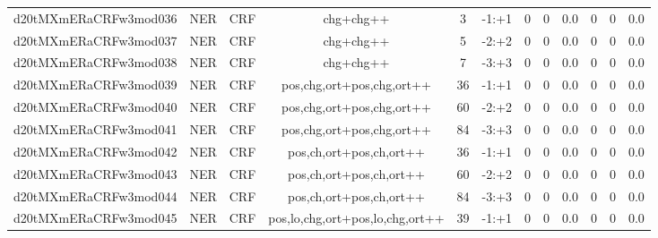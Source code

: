 \documentclass[a4paper]{article}
\begin{document}
\begin{landscape}
\begin{center}
\begin{tabular}{ |c|c|c|c|c|c|c|c|c|c|c|c|}
 
 	
 	\small{ d20tMXmERaCRFw3mod036 } & \small{ NER} & \small{  CRF }  & chg+chg++  &  3 &  \small{  -1:+1 }  &  0 & 0 & 0.0  &  0 & 0 & 0.0 \\
 	

 
 	
 	\small{ d20tMXmERaCRFw3mod037 } & \small{ NER} & \small{  CRF }  & chg+chg++  &  5 &  \small{  -2:+2 }  &  0 & 0 & 0.0  &  0 & 0 & 0.0 \\
 	

 
 	
 	\small{ d20tMXmERaCRFw3mod038 } & \small{ NER} & \small{  CRF }  & chg+chg++  &  7 &  \small{  -3:+3 }  &  0 & 0 & 0.0  &  0 & 0 & 0.0 \\
 	

 
 	
 	\small{ d20tMXmERaCRFw3mod039 } & \small{ NER} & \small{  CRF }  & pos,chg,ort+pos,chg,ort++  &  36 &  \small{  -1:+1 }  &  0 & 0 & 0.0  &  0 & 0 & 0.0 \\
 	

 
 	
 	\small{ d20tMXmERaCRFw3mod040 } & \small{ NER} & \small{  CRF }  & pos,chg,ort+pos,chg,ort++  &  60 &  \small{  -2:+2 }  &  0 & 0 & 0.0  &  0 & 0 & 0.0 \\
 	

 
 	
 	\small{ d20tMXmERaCRFw3mod041 } & \small{ NER} & \small{  CRF }  & pos,chg,ort+pos,chg,ort++  &  84 &  \small{  -3:+3 }  &  0 & 0 & 0.0  &  0 & 0 & 0.0 \\
 	

 
 	
 	\small{ d20tMXmERaCRFw3mod042 } & \small{ NER} & \small{  CRF }  & pos,ch,ort+pos,ch,ort++  &  36 &  \small{  -1:+1 }  &  0 & 0 & 0.0  &  0 & 0 & 0.0 \\
 	

 
 	
 	\small{ d20tMXmERaCRFw3mod043 } & \small{ NER} & \small{  CRF }  & pos,ch,ort+pos,ch,ort++  &  60 &  \small{  -2:+2 }  &  0 & 0 & 0.0  &  0 & 0 & 0.0 \\
 	

 
 	
 	\small{ d20tMXmERaCRFw3mod044 } & \small{ NER} & \small{  CRF }  & pos,ch,ort+pos,ch,ort++  &  84 &  \small{  -3:+3 }  &  0 & 0 & 0.0  &  0 & 0 & 0.0 \\
 	

 
 	
 	\small{ d20tMXmERaCRFw3mod045 } & \small{ NER} & \small{  CRF }  & pos,lo,chg,ort+pos,lo,chg,ort++  &  39 &  \small{  -1:+1 }  &  0 & 0 & 0.0  &  0 & 0 & 0.0 \\
 	


\end{tabular}
\end{center}
\end{landscape}
\end{document}
